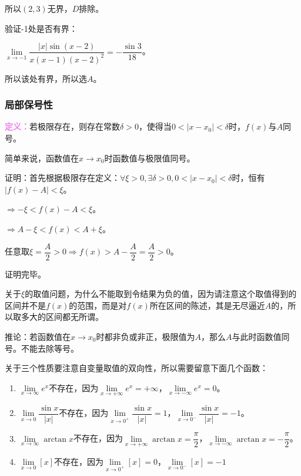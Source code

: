 \documentclass[UTF8, 12pt]{ctexart}
\begin{document}
        所以$(2,3)$无界，$D$排除。\medskip

        验证-1处是否有界：\medskip

        $\lim\limits_{x\to -1}\dfrac{\vert x\vert\sin(x-2)}{x(x-1)(x-2)^2}=-\dfrac{\sin 3}{18}$。\medskip

        所以该处有界，所以选$A$。

        \subsubsection{局部保号性}

        \textcolor{violet}{\textbf{定义：}}若极限存在，则存在常数$\delta>0$，使得当$0<\vert x-x_0\vert<\delta$时，$f(x)$与$A$同号。

        简单来说，函数值在$x\to x_0$时函数值与极限值同号。

        证明：首先根据极限存在定义：$\forall\xi>0,\exists\delta>0,0<\vert x-x_0\vert<\delta$时，恒有$\vert f(x)-A\vert<\xi$。

        $\Rightarrow -\xi<f(x)-A<\xi$。

        $\Rightarrow A-\xi<f(x)<A+\xi$。

        任意取$\xi=\dfrac{A}{2}>0\Rightarrow f(x)>A-\dfrac{A}{2}=\dfrac{A}{2}>0$。

        证明完毕。

        关于$\xi$的取值问题，为什么不能取到令结果为负的值，因为请注意这个取值得到的区间并不是$f(x)$的范围，而是对$f(x)$所在区间的陈述，其是无尽逼近$A$的，所以取多大的区间都无所谓。

        推论：若函数值在$x\to x_0$时都非负或非正，极限值为$A$，那么$A$与此时函数值同号。不能去除等号。

        \medskip

        关于三个性质要注意自变量取值的双向性，所以需要留意下面几个函数：

        \begin{enumerate}
            \item $\lim\limits_{x\to\infty}e^x$不存在，因为$\lim\limits_{x\to +\infty}e^x=+\infty$，$\lim\limits_{x\to -\infty}e^x=0$。
            \item $\lim\limits_{x\to 0}\dfrac{\sin x}{\vert x\vert}$不存在，因为$\lim\limits_{x\to 0^+}\dfrac{\sin x}{\vert x\vert}=1$，$\lim\limits_{x\to 0^-}\dfrac{\sin x}{\vert x\vert}=-1$。
            \item $\lim\limits_{x\to\infty}\arctan x$不存在，因为$\lim\limits_{x\to +\infty}\arctan x=\dfrac{\pi}{2}$，$\lim\limits_{x\to -\infty}\arctan x=-\dfrac{\pi}{2}$。
            \item $\lim\limits_{x\to 0}[x]$不存在，因为$\lim\limits_{x\to 0^+}[x]=0$，$\lim\limits_{x\to 0^-}[x]=-1$
        \end{enumerate}
\end{document}
